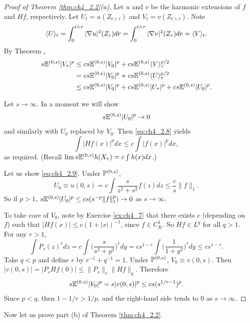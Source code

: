 \begin{proof}[Proof of Theorem \ref{thm:ch4_2.2}(a)]
Let $u$ and $v$ be the harmonic extensions of $f$ and $Hf$, respectively. Let $U_t = u(Z_{t\wedge\tau})$ and $V_t = v(Z_{t\wedge\tau})$. Note
\[
    \lrang{U}_t = \int_0^{t\wedge\tau} |\nabla u|^2(Z_r)dr = \int_0^{t\wedge\tau} |\nabla v|^2(Z_r)dr = \lrang{V}_t.
\]
By Theorem ,
\begin{align}\label{eq:ch4_2.8}
    s\E^{(0,s)}|V_\tau|^p &\leq cs\E^{(0,s)}|V_0|^p + cs\E^{(0,s)}\lrang{V}_\tau^{p/2} \\
    &= cs\E^{(0,s)}|V_0|^p + cs\E^{(0,s)}\lrang{U}_\tau^{p/2} \notag \\
    &\leq cs\E^{(0,s)}|V_0|^p + cs\E^{(0,s)}|U_\tau|^p + cs\E^{(0,s)}|U_0|^p. \notag
\end{align}

Let $s \to \infty$. In a moment we will show
\begin{equation}\label{eq:ch4_2.9}
    s\E^{(0,s)}|U_0|^p \to 0
\end{equation}
and similarly with $U_0$ replaced by $V_0$. Then \eqref{eq:ch4_2.8} yields
\[
    \int |Hf(x)|^pdx \leq c\int |f(x)|^pdx,
\]
as required. (Recall $\lim s\E^{(0,s)}h(X_\tau) = c\int h(x)dx$.)

Let us show \eqref{eq:ch4_2.9}. Under $\P^{(0,s)}$,
\[
    U_0 \equiv u(0,s) = c\int \frac{s}{z^2 + s^2}f(z)dz \leq \frac{c}{s}\|f\|_1.
\]
So if $p > 1$, $s\E^{(0,s)}|U_0|^p \leq cs(s^{-p}\|f\|_1^p) \to 0$ as $s \to \infty$.

To take care of $V_0$, note by Exercise \ref{ex:ch4_7} that there exists $c$ (depending on $f$) such that $|Hf(x)| \leq c(1 + |x|)^{-1}$, since $f \in C_K^1$. So $Hf \in L^q$ for all $q > 1$. For any $r > 1$,
\[
    \int P_s(z)^rdz = c\int \Big(\frac{s}{s^2 + y^2}\Big)^r dy = cs^{1-r}\int \Big(\frac{1}{1 + y^2}\Big)^r dy \leq cs^{1-r}.
\]
Take $q < p$ and define $r$ by $r^{-1} + q^{-1} = 1$. Under $\P^{(0,s)}$, $V_0 \equiv v(0,s)$. Then $|v(0,s)| = |P_s Hf(0)| \leq \|P_s\|_r\|Hf\|_q$. Therefore
\[
    s\E^{(0,s)}|V_0|^p = s|v(0,s)|^p \leq cs(s^{1/r-1})^p.
\]
Since $p<q$, then $1-1/r>1/p$, and the right-hand side tends to $0$ as $s \to \infty$.
\end{proof}


Now let us prove part (b) of Theorem \ref{thm:ch4_2.2}.

